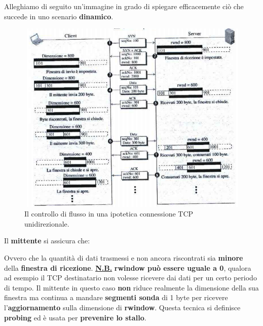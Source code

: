 \documentclass[11pt,a4paper,oneside]{book}
\theoremstyle{definition}
\begin{document}
\pagebreak

Alleghiamo di seguito un'immagine in grado di spiegare efficacemente ciò che succede in uno scenario \textbf{dinamico}.
\begin{figure}[!h]
	\includegraphics[scale=0.65]{Immagini/Dyn_win.png}
	\centering
	\caption{Il controllo di flusso in una ipotetica connessione TCP unidirezionale.}
\end{figure}
\begin{center}
\end{center}
Il \textbf{mittente} si assicura che:
\begin{center}
\end{center}
Ovvero che la quantità di dati trasmessi e non ancora riscontrati sia \textbf{minore} della \textbf{finestra di ricezione}.\newline
\textbf{\underline{N.B.}} \textbf{rwindow può essere uguale a 0}, qualora ad esempio il TCP destinatario non volesse ricevere dai dati per un certo periodo di tempo. Il mittente in questo caso \textbf{non} riduce realmente la dimensione della sua finestra ma continua a mandare \textbf{segmenti sonda} di 1 byte per ricevere l’\textbf{aggiornamento} sulla dimensione di \textbf{rwindow}. Questa tecnica si definisce \textbf{probing} ed è usata per \textbf{prevenire
	lo stallo}.

\pagebreak
\end{document}
